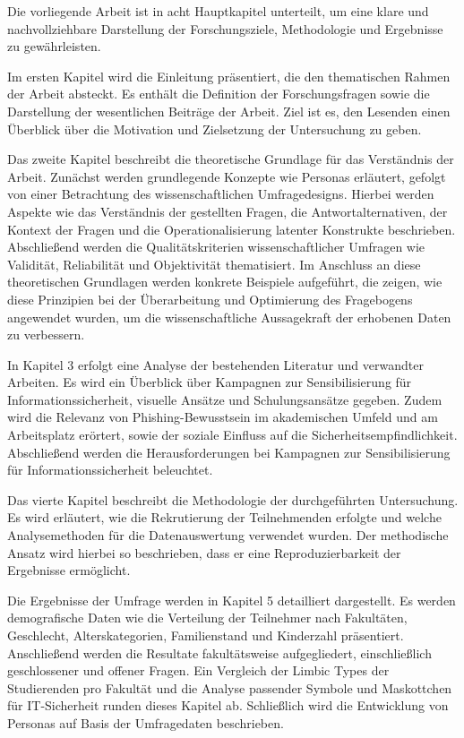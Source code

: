 \documentclass[german,report]{i1thesis}
\begin{document}
Die vorliegende Arbeit ist in acht Hauptkapitel unterteilt, um eine klare und nachvollziehbare Darstellung der Forschungsziele, Methodologie und Ergebnisse zu gewährleisten.

Im ersten Kapitel wird die Einleitung präsentiert, die den thematischen Rahmen der Arbeit absteckt. Es enthält die Definition der Forschungsfragen sowie die Darstellung der wesentlichen Beiträge der Arbeit. Ziel ist es, den Lesenden einen Überblick über die Motivation und Zielsetzung der Untersuchung zu geben.

Das zweite Kapitel beschreibt die theoretische Grundlage für das Verständnis der Arbeit. Zunächst werden grundlegende Konzepte wie Personas erläutert, gefolgt von einer Betrachtung des wissenschaftlichen Umfragedesigns. Hierbei werden Aspekte wie das Verständnis der gestellten Fragen, die Antwortalternativen, der Kontext der Fragen und die Operationalisierung latenter Konstrukte beschrieben. Abschließend werden die Qualitätskriterien wissenschaftlicher Umfragen wie Validität, Reliabilität und Objektivität thematisiert.
Im Anschluss an diese theoretischen Grundlagen werden konkrete Beispiele aufgeführt, die zeigen, wie diese Prinzipien bei der Überarbeitung und Optimierung des Fragebogens angewendet wurden, um die wissenschaftliche Aussagekraft der erhobenen Daten zu verbessern.

In Kapitel 3 erfolgt eine Analyse der bestehenden Literatur und verwandter Arbeiten. Es wird ein Überblick über Kampagnen zur Sensibilisierung für Informationssicherheit, visuelle Ansätze und Schulungsansätze gegeben. Zudem wird die Relevanz von Phishing-Bewusstsein im akademischen Umfeld und am Arbeitsplatz erörtert, sowie der soziale Einfluss auf die Sicherheitsempfindlichkeit. Abschließend werden die Herausforderungen bei Kampagnen zur Sensibilisierung für Informationssicherheit beleuchtet.

Das vierte Kapitel beschreibt die Methodologie der durchgeführten Untersuchung. Es wird erläutert, wie die Rekrutierung der Teilnehmenden erfolgte und welche Analysemethoden für die Datenauswertung verwendet wurden. Der methodische Ansatz wird hierbei so beschrieben, dass er eine Reproduzierbarkeit der Ergebnisse ermöglicht.

Die Ergebnisse der Umfrage werden in Kapitel 5 detailliert dargestellt. Es werden demografische Daten wie die Verteilung der Teilnehmer nach Fakultäten, Geschlecht, Alterskategorien, Familienstand und Kinderzahl präsentiert. Anschließend werden die Resultate fakultätsweise aufgegliedert, einschließlich geschlossener und offener Fragen. Ein Vergleich der Limbic Types \cite{hausel2011wissenschaftliche} der Studierenden pro Fakultät und die Analyse passender Symbole und Maskottchen für IT-Sicherheit runden dieses Kapitel ab. Schließlich wird die Entwicklung von Personas auf Basis der Umfragedaten beschrieben.
\end{document}
